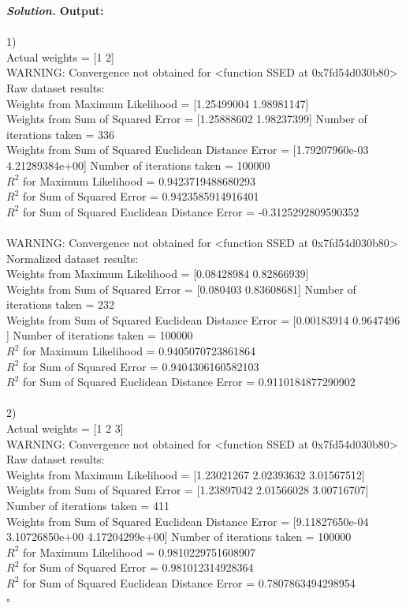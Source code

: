 \documentclass[8pt]{article}
\newenvironment{solution}[1][\it{Solution}]{\textbf{#1. } }{$\square$}
\begin{document}
\begin{solution}
\textbf{Output:}\\
\\
1)\\
Actual weights =  [1 2] \\
WARNING: Convergence not obtained for <function SSED at 0x7fd54d030b80>\\
Raw dataset results:\\
Weights from Maximum Likelihood = [1.25499004 1.98981147] \\
Weights from Sum of Squared Error = [1.25888602 1.98237399] Number of iterations taken =  336 \\
Weights from Sum of Squared Euclidean Distance Error = [1.79207960e-03 4.21289384e+00] Number of iterations taken =  100000 \\
$R^2$ for Maximum Likelihood = 0.9423719488680293 \\
$R^2$ for Sum of Squared Error = 0.9423585914916401 \\
$R^2$ for Sum of Squared Euclidean Distance Error = -0.3125292809590352 \\
\\
WARNING: Convergence not obtained for <function SSED at 0x7fd54d030b80>\\
Normalized dataset results:\\
Weights from Maximum Likelihood = [0.08428984 0.82866939] \\
Weights from Sum of Squared Error = [0.080403   0.83608681] Number of iterations taken =  232 \\
Weights from Sum of Squared Euclidean Distance Error = [0.00183914 0.9647496 ] Number of iterations taken =  100000 \\
$R^2$ for Maximum Likelihood = 0.9405070723861864 \\
$R^2$ for Sum of Squared Error = 0.9404306160582103 \\
$R^2$ for Sum of Squared Euclidean Distance Error = 0.9110184877290902 \\
\\
2)\\
Actual weights =  [1 2 3] \\
WARNING: Convergence not obtained for <function SSED at 0x7fd54d030b80>\\
Raw dataset results:\\
Weights from Maximum Likelihood = [1.23021267 2.02393632 3.01567512] \\
Weights from Sum of Squared Error = [1.23897042 2.01566028 3.00716707] Number of iterations taken =  411 \\
Weights from Sum of Squared Euclidean Distance Error = [9.11827650e-04 3.10726850e+00 4.17204299e+00] Number of iterations taken =  100000 \\
$R^2$ for Maximum Likelihood = 0.9810229751608907 \\
$R^2$ for Sum of Squared Error = 0.981012314928364 \\
$R^2$ for Sum of Squared Euclidean Distance Error = 0.7807863494298954 \\


\end{solution}
\end{document}
